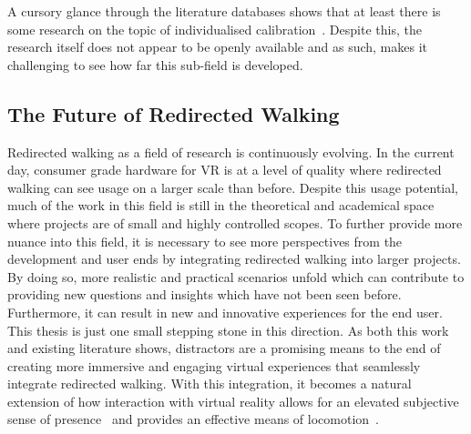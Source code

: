 A cursory glance through the literature databases shows that at least there is some research on the topic of individualised calibration~\cite{hutton2018individualized}. Despite this, the research itself does not appear to be openly available and as such, makes it challenging to see how far this sub-field is developed. 

\subsection{The Future of Redirected Walking}
Redirected walking as a field of research is continuously evolving. In the current day, consumer grade hardware for VR is at a level of quality where redirected walking can see usage on a larger scale than before. Despite this usage potential, much of the work in this field is still in the theoretical and academical space where projects are of small and highly controlled scopes. To further provide more nuance into this field, it is necessary to see more perspectives from the development and user ends by integrating redirected walking into larger projects. By doing so, more realistic and practical scenarios unfold which can contribute to providing new questions and insights which have not been seen before. 
Furthermore, it can result in new and innovative experiences for the end user. This thesis is just one small stepping stone in this direction. As both this work and existing literature shows, distractors are a promising means to the end of creating more immersive and engaging virtual experiences that seamlessly integrate redirected walking. With this integration, it becomes a natural extension of how interaction with virtual reality allows for an elevated subjective sense of presence~\cite{peck2009evaluation, peck2011evaluation} and provides an effective means of locomotion~\cite{razzaque2001redirected, peck2011evaluation}.

\iffalse
   * Having people's first experience with VR be with redirected walking
      * They might normalise the redirected walking elements
         * \todo{Will have to look deeper into the data on people with no experience and how many detections they did}

\subsection{Distractor Salience and Optical Flow}
* How does salience impact optical flow? How does this then impact the noticeability of redirection?
* Already covered by other sections I'd say
\fi
